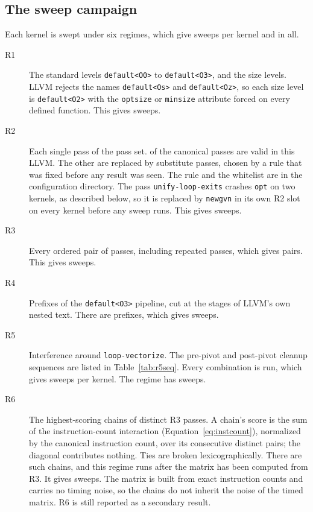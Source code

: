\subsection{The sweep campaign}

Each kernel is swept under six regimes, which give \SweepsPerKernel{} sweeps per kernel and \NumSweeps{} in all.

\begin{description}
  \item[R1] The standard levels \texttt{default<\allowbreak{}O0>} to \texttt{default<\allowbreak{}O3>}, and the size levels. LLVM \LLVMVersion{} rejects
        the names \texttt{default<\allowbreak{}Os>} and \texttt{default<\allowbreak{}Oz>}, so each size level is \texttt{default<\allowbreak{}O2>} with the
        \texttt{optsize} or \texttt{minsize} attribute forced on every defined function. This gives \NumOneSweeps{} sweeps.
  \item[R2] Each single pass of the pass set. \ValidCanonicalPassCount{} of the \CanonicalPassCount{} canonical passes are
        valid in this LLVM. The other \RejectedCanonicalCount{} are replaced by \SubstituteCount{} substitute passes, chosen
        by a rule that was fixed before any result was seen. The rule and the whitelist are in the configuration directory. The pass \texttt{unify-loop-exits} crashes \texttt{opt} on two kernels, as described below, so it is replaced by \texttt{newgvn} in its own R2 slot on every kernel before any sweep runs.
        This gives \NumTwoSweeps{} sweeps.
  \item[R3] Every ordered pair of \NumThreePasses{} passes, including repeated passes, which gives \NumThreeCombinations{} pairs.
        This gives \NumThreeSweeps{} sweeps.
  \item[R4] Prefixes of the \texttt{default<\allowbreak{}O3>} pipeline, cut at the stages of LLVM's own nested text. There are
        \FourPrefixStages{} prefixes, which gives \NumFourSweeps{} sweeps.
  \item[R5] Interference around \texttt{loop-vectorize}. The \NumFivePreSequences{} pre-pivot and \NumFivePostSequences{}
        post-pivot cleanup sequences are listed in Table~\ref{tab:r5seq}. Every combination is run, which gives
        \NumFiveCombinations{} sweeps per kernel. The regime has \NumFiveSweeps{} sweeps.
  \item[R6] The \SixSequencesPerKernel{} highest-scoring chains of \SixSequenceLength{} distinct R3 passes. A chain's score is the sum of the instruction-count interaction (Equation~\ref{eq:instcount}), normalized by the canonical instruction count, over its consecutive distinct pairs; the diagonal contributes nothing. Ties are broken lexicographically. There are \SixCandidates{} such chains, and this regime runs after the matrix has been computed from R3. It gives \NumSixSweeps{} sweeps. The matrix is built from exact instruction counts and carries no timing noise, so the chains do not inherit the noise of the timed matrix. R6 is still reported as a secondary result.
\end{description}


